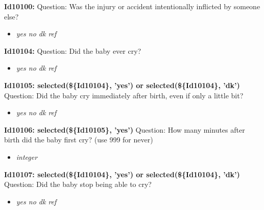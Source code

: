\documentclass{article}%
\begin{document}
\textbf{Id10100: \newline%
}%
Question: Was the injury or accident intentionally inflicted by someone else?\newline%
%
\begin{itemize}%
\item%
\textit{yes\newline%
 no\newline%
 dk\newline%
 ref\newline%
}%
\end{itemize}%
\textbf{Id10104: \newline%
}%
Question: Did the baby ever cry?\newline%
%
\begin{itemize}%
\item%
\textit{yes\newline%
 no\newline%
 dk\newline%
 ref\newline%
}%
\end{itemize}%
\textbf{Id10105: selected(\$\{Id10104\}, 'yes') or selected(\$\{Id10104\}, 'dk')\newline%
}%
Question: Did the baby cry immediately after birth, even if only a little bit?\newline%
%
\begin{itemize}%
\item%
\textit{yes\newline%
 no\newline%
 dk\newline%
 ref\newline%
}%
\end{itemize}%
\textbf{Id10106: selected(\$\{Id10105\}, 'yes')\newline%
}%
Question: How many minutes after birth did the baby first cry? (use 999 for never)\newline%
%
\begin{itemize}%
\item%
\textit{integer\newline%
}%
\end{itemize}%
\textbf{Id10107: selected(\$\{Id10104\}, 'yes') or selected(\$\{Id10104\}, 'dk')\newline%
}%
Question: Did the baby stop being able to cry?\newline%
%
\begin{itemize}%
\item%
\textit{yes\newline%
 no\newline%
 dk\newline%
 ref\newline%
}%
\end{itemize}%
\end{document}
